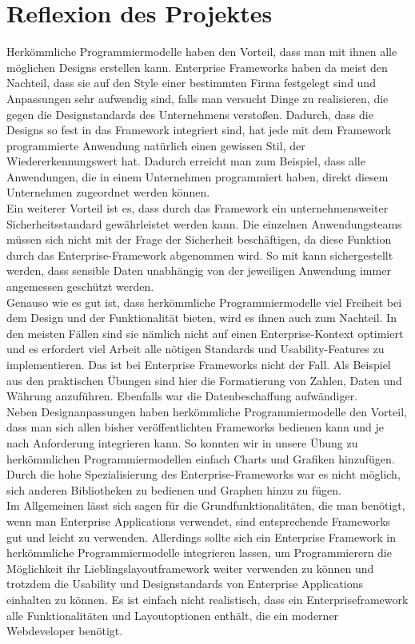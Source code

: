 \section{Reflexion des Projektes}
Herkömmliche Programmiermodelle haben den Vorteil, dass man mit ihnen alle möglichen Designs erstellen kann. Enterprise Frameworks haben da meist den Nachteil, dass sie auf den Style einer bestimmten Firma festgelegt sind und Anpassungen sehr aufwendig sind, falls man versucht Dinge zu realisieren, die gegen die Designstandards des Unternehmens verstoßen. Dadurch, dass die Designs so fest in das Framework integriert sind, hat jede mit dem Framework programmierte Anwendung natürlich einen gewissen Stil, der Wiedererkennungswert hat. Dadurch erreicht man zum Beispiel, dass alle Anwendungen, die in einem Unternehmen programmiert haben, direkt diesem Unternehmen zugeordnet werden können. 
\\
Ein weiterer Vorteil ist es, dass durch das Framework ein unternehmensweiter Sicherheitsstandard gewährleistet werden kann. Die einzelnen Anwendungsteams müssen sich nicht mit der Frage der Sicherheit beschäftigen, da diese Funktion durch das Enterprise-Framework abgenommen wird. So mit kann sichergestellt werden, dass sensible Daten unabhängig von der jeweiligen Anwendung immer angemessen geschützt werden.
\\
Genauso wie es gut ist, dass herkömmliche Programmiermodelle viel Freiheit bei dem Design und der Funktionalität bieten, wird es ihnen auch zum Nachteil. In den meisten Fällen sind sie nämlich nicht auf einen Enterprise-Kontext optimiert und es erfordert viel Arbeit alle nötigen Standards und Usability-Features zu implementieren. Das ist bei Enterprise Frameworks nicht der Fall. Als Beispiel aus den praktischen Übungen sind hier die Formatierung von Zahlen, Daten und Währung anzuführen. Ebenfalls war die Datenbeschaffung aufwändiger.
\\
Neben Designanpassungen haben herkömmliche Programmiermodelle den Vorteil, dass man sich allen bisher veröffentlichten Frameworks bedienen kann und je nach Anforderung integrieren kann. So konnten wir in unsere Übung zu herkömmlichen Programmiermodellen einfach Charts und Grafiken hinzufügen. Durch die hohe Spezialisierung des Enterprise-Frameworks war es nicht möglich, sich anderen Bibliotheken zu bedienen und Graphen hinzu zu fügen.
\\
Im Allgemeinen lässt sich sagen für die Grundfunktionalitäten, die man benötigt, wenn man Enterprise Applications verwendet, sind entsprechende Frameworks gut und leicht zu verwenden. Allerdings sollte sich ein Enterprise Framework in herkömmliche Programmiermodelle integrieren lassen, um Programmierern die Möglichkeit ihr Lieblingslayoutframework weiter verwenden zu können und trotzdem die Usability und Designstandards von Enterprise Applications einhalten zu können. Es ist einfach nicht realistisch, dass ein Enterpriseframework alle Funktionalitäten und Layoutoptionen enthält, die ein moderner Webdeveloper benötigt.
